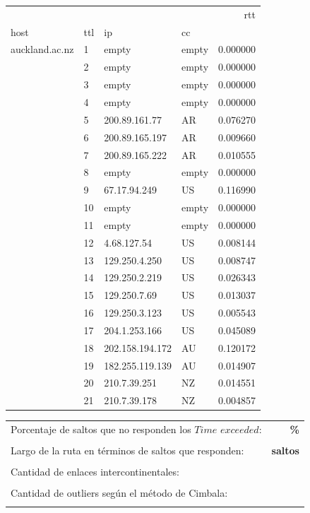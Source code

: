 \begin{center}
\begin{tabular}{llllr}
\toprule
               &    &               &    &       rtt \\
host & ttl & ip & cc &           \\
\midrule
auckland.ac.nz & 1  & empty & empty &  0.000000 \\
               & 2  & empty & empty &  0.000000 \\
               & 3  & empty & empty &  0.000000 \\
               & 4  & empty & empty &  0.000000 \\
               & 5  & 200.89.161.77 & AR &  0.076270 \\
               & 6  & 200.89.165.197 & AR &  0.009660 \\
               & 7  & 200.89.165.222 & AR &  0.010555 \\
               & 8  & empty & empty &  0.000000 \\
               & 9  & 67.17.94.249 & US &  0.116990 \\
               & 10 & empty & empty &  0.000000 \\
               & 11 & empty & empty &  0.000000 \\
               & 12 & 4.68.127.54 & US &  0.008144 \\
               & 13 & 129.250.4.250 & US &  0.008747 \\
               & 14 & 129.250.2.219 & US &  0.026343 \\
               & 15 & 129.250.7.69 & US &  0.013037 \\
               & 16 & 129.250.3.123 & US &  0.005543 \\
               & 17 & 204.1.253.166 & US &  0.045089 \\
               & 18 & 202.158.194.172 & AU &  0.120172 \\
               & 19 & 182.255.119.139 & AU &  0.014907 \\
               & 20 & 210.7.39.251 & NZ &  0.014551 \\
               & 21 & 210.7.39.178 & NZ &  0.004857 \\
\bottomrule
\end{tabular}
\end{center}

\begin{center}
\begin{tabular}{p{6.5cm}r}
Porcentaje de saltos que no responden los $Time$ $exceeded$: & \textbf{\%} \\ \\ 
Largo de la ruta en términos de saltos que responden: &\textbf{ saltos} \\ \\
Cantidad de enlaces intercontinentales: & \textbf{} \\ \\
Cantidad de outliers según el método de Cimbala: & \textbf{} \\ \\
\end{tabular}
\end{center}

